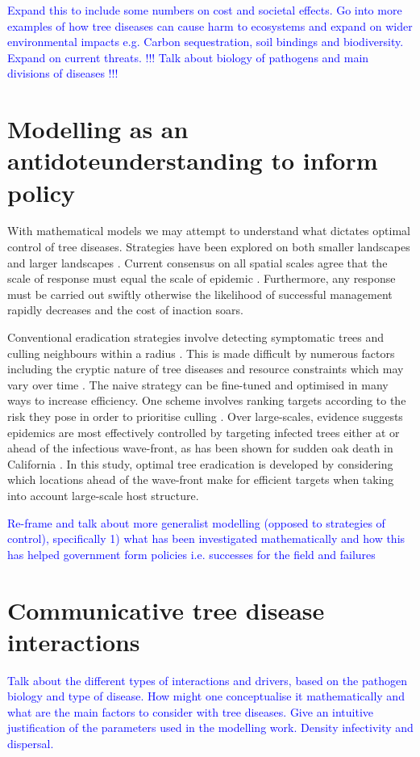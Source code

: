 \textcolor{blue}{Expand this to include some numbers on cost and societal effects. Go into more examples of how tree diseases can cause harm to ecosystems and expand on wider environmental impacts e.g. Carbon sequestration, soil bindings and biodiversity. Expand  on current threats. !!! Talk about biology of pathogens and main divisions of diseases !!!}

\section{Modelling as an antidote\textemdash understanding to inform policy}
With mathematical models we may attempt to understand what dictates optimal control of tree diseases. Strategies have been explored on both smaller landscapes \cite{WEBIDEMICS, risk-potential-control} and larger landscapes \cite{large-scale-control, large-scale-control2}. Current consensus on all spatial scales agree that the scale of response must equal the scale of epidemic \cite{control-scale-matching}. Furthermore, any response must be carried out swiftly otherwise the likelihood of successful management rapidly decreases and the cost of inaction soars.

Conventional eradication strategies involve detecting symptomatic trees and culling neighbours within a radius \cite{WEBIDEMICS}. This is made difficult by numerous factors including the cryptic nature of tree diseases and resource constraints which may vary over time \cite{control-theory, control-theory-application}. The naive strategy can be fine-tuned and optimised in many ways to increase efficiency. One scheme involves ranking targets according to the risk they pose in order to prioritise culling \cite{risk-potential-control}. Over large-scales, evidence suggests epidemics are most effectively controlled by targeting infected trees either at or ahead of the infectious wave-front, as has been shown for sudden oak death in California \cite{large-scale-control}. In this study, optimal tree eradication is developed by considering which locations ahead of the wave-front make for efficient targets when taking into account large-scale host structure.

\textcolor{blue}{Re-frame and talk about more generalist modelling (opposed to strategies of control), specifically 1) what has been investigated mathematically and how this has helped government form policies i.e. successes for the field and failures}

\section{Communicative tree disease interactions}

\blindtext[1]

\textcolor{blue}{Talk about the different types of interactions and drivers, based on the pathogen biology and type of disease. How might one conceptualise it mathematically and what are the main factors to consider with tree diseases. Give an intuitive justification of the parameters used in the modelling work. Density infectivity and dispersal.}
